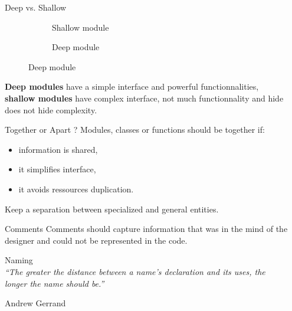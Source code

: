 \documentclass[xcolor={table}]{beamer}
\begin{document}
\begin{frame}[fragile=singleslide,t]
\begin{columns}[onlytextwidth,T]
\begin{column}{.47\textwidth}
    \end{column}
    \begin{column}{.47\textwidth}

      \begin{block}{Deep vs. Shallow}

        \begin{figure}
          \centering
          \begin{subfigure}[t]{0.47\textwidth}
            \centering \scalebox{0.5}{}
            \caption{Shallow module}
          \end{subfigure}
          \hfill
          \begin{subfigure}[t]{0.47\textwidth}
            \centering
            \centering \scalebox{0.4}{}
            \caption{Deep module}
          \end{subfigure}
        \end{figure}

        \textbf{Deep modules} have a simple interface and powerful functionnalities, \textbf{shallow modules} have complex interface, not much functionnality and hide does not hide complexity.
      \end{block}      
      \begin{block}{Together or Apart ?}
        Modules, classes or functions should be together if:
        \begin{itemize}
        \item information is shared,
        \item it simplifies interface,
        \item it avoids ressources duplication.
        \end{itemize}
        Keep a separation between specialized and general entities.
      \end{block}


      \begin{block}{Comments}
        Comments should capture information that was in the mind of the designer and could not be represented in the code.
      \end{block}

      \begin{block}{Naming}
        ~\\
        \emph{``The greater the distance between a name's declaration and its uses, the longer the name should be.''}
        \begin{flushright}Andrew Gerrand\end{flushright}
      \end{block}
            
    \end{column}
  \end{columns}
\end{frame}
\end{document}
